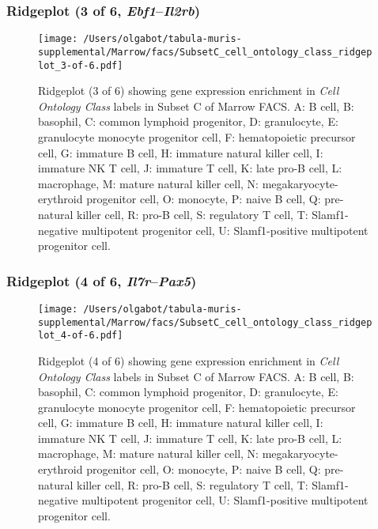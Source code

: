 \subsubsection{Ridgeplot (3 of 6, \emph{Ebf1}--\emph{Il2rb})}
\begin{figure}[h]
\centering
\texttt{[image: /Users/olgabot/tabula-muris-supplemental/Marrow/facs/SubsetC\_cell\_ontology\_class\_ridgeplot\_3-of-6.pdf]}

\caption{ Ridgeplot (3 of 6)  showing gene expression enrichment in \emph{Cell Ontology Class} labels in Subset C of Marrow FACS. A: B cell, B: basophil, C: common lymphoid progenitor, D: granulocyte, E: granulocyte monocyte progenitor cell, F: hematopoietic precursor cell, G: immature B cell, H: immature natural killer cell, I: immature NK T cell, J: immature T cell, K: late pro-B cell, L: macrophage, M: mature natural killer cell, N: megakaryocyte-erythroid progenitor cell, O: monocyte, P: naive B cell, Q: pre-natural killer cell, R: pro-B cell, S: regulatory T cell, T: Slamf1-negative multipotent progenitor cell, U: Slamf1-positive multipotent progenitor cell.}
\end{figure}


\clearpage

\subsubsection{Ridgeplot (4 of 6, \emph{Il7r}--\emph{Pax5})}
\begin{figure}[h]
\centering
\texttt{[image: /Users/olgabot/tabula-muris-supplemental/Marrow/facs/SubsetC\_cell\_ontology\_class\_ridgeplot\_4-of-6.pdf]}

\caption{ Ridgeplot (4 of 6)  showing gene expression enrichment in \emph{Cell Ontology Class} labels in Subset C of Marrow FACS. A: B cell, B: basophil, C: common lymphoid progenitor, D: granulocyte, E: granulocyte monocyte progenitor cell, F: hematopoietic precursor cell, G: immature B cell, H: immature natural killer cell, I: immature NK T cell, J: immature T cell, K: late pro-B cell, L: macrophage, M: mature natural killer cell, N: megakaryocyte-erythroid progenitor cell, O: monocyte, P: naive B cell, Q: pre-natural killer cell, R: pro-B cell, S: regulatory T cell, T: Slamf1-negative multipotent progenitor cell, U: Slamf1-positive multipotent progenitor cell.}
\end{figure}


\clearpage

